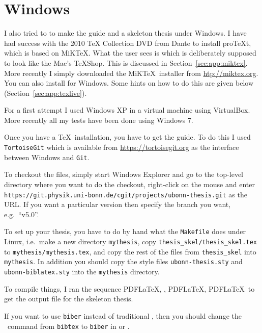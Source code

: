 \section{Windows}
\label{sec:app:windows}

I also tried to to make the guide and a skeleton thesis under
Windows. I have had success with the 2010 \TeX{} Collection DVD from Dante to install
pro\TeX t, which is based on MiK\TeX. 
What the user sees is \TeXworks
which is deliberately supposed to look like the Mac's \TeX Shop. This
is discussed in Section~\ref{sec:app:miktex}.
More recently I simply downloaded the MiK\TeX\ installer from
\url{htp://miktex.org}.
You can also install \TeXLive for Windows. Some hints on how to do
this are given below (Section~\ref{sec:app:texlive}).

For a first attempt I used Windows XP in a virtual machine using
VirtualBox. More recently all my tests have been done using Windows 7.

Once you have a \TeX\ installation, you have to get the guide. To do
this I used \texttt{TortoiseGit} which is available from
\url{https://tortoisegit.org} as the interface between Windows and
\texttt{Git}.

To checkout the files, simply start Windows Explorer and go to the
top-level directory where you want to do the checkout, right-click on
the mouse and enter\\
\texttt{https://git.physik.uni-bonn.de/cgit/projects/ubonn-thesis.git}
as the URL.
If you want a particular version then specify the branch you want, e.g.\ \enquote{v5.0}.

To set up your thesis, you have to do by hand what the
\texttt{Makefile} does under Linux, i.e.\ make a new directory
\texttt{mythesis}, copy \texttt{thesis\_skel/thesis\_skel.tex} to
\texttt{mythesis/mythesis.tex}, and copy the rest of the files from
\texttt{thesis\_skel} into \texttt{mythesis}. In addition you should
copy the style files \texttt{ubonn-thesis.sty} and \texttt{ubonn-biblatex.sty} into the
\texttt{mythesis} directory.

To compile things, I ran the sequence PDF\LaTeX, \BibTeX, PDF\LaTeX,
PDF\LaTeX\ to get the output file for the skeleton thesis.

If you want to use \texttt{biber} instead of traditional \BibTeX, then you should
change the \BibTeX\ command from \texttt{bibtex} to \texttt{biber} in
\TeXstudio or \TeXworks.

